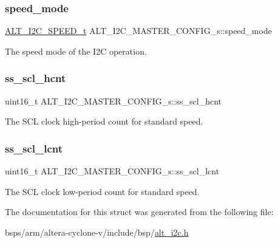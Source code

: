 \subsubsection{\texorpdfstring{speed\_mode}{speed\_mode}}
{\footnotesize\ttfamily \mbox{\hyperlink{group__ALT__I2C_ga1601b0e27fb2a82170d10b4f6bdedbf6}{A\+L\+T\+\_\+\+I2\+C\+\_\+\+S\+P\+E\+E\+D\+\_\+t}} A\+L\+T\+\_\+\+I2\+C\+\_\+\+M\+A\+S\+T\+E\+R\+\_\+\+C\+O\+N\+F\+I\+G\+\_\+s\+::speed\+\_\+mode}

The speed mode of the I2C operation. \mbox{\label{structALT__I2C__MASTER__CONFIG__s_a2c2147d744d76fa6df10232eecb097fa}} 
\subsubsection{\texorpdfstring{ss\_scl\_hcnt}{ss\_scl\_hcnt}}
{\footnotesize\ttfamily uint16\+\_\+t A\+L\+T\+\_\+\+I2\+C\+\_\+\+M\+A\+S\+T\+E\+R\+\_\+\+C\+O\+N\+F\+I\+G\+\_\+s\+::ss\+\_\+scl\+\_\+hcnt}

The S\+CL clock high-\/period count for standard speed. \mbox{\label{structALT__I2C__MASTER__CONFIG__s_a42a8443ec6e4f7524c0cc6b5c58d676e}} 
\subsubsection{\texorpdfstring{ss\_scl\_lcnt}{ss\_scl\_lcnt}}
{\footnotesize\ttfamily uint16\+\_\+t A\+L\+T\+\_\+\+I2\+C\+\_\+\+M\+A\+S\+T\+E\+R\+\_\+\+C\+O\+N\+F\+I\+G\+\_\+s\+::ss\+\_\+scl\+\_\+lcnt}

The S\+CL clock low-\/period count for standard speed. 

The documentation for this struct was generated from the following file\+:\begin{DoxyCompactItemize}
\item 
bsps/arm/altera-\/cyclone-\/v/include/bsp/\mbox{\hyperlink{alt__i2c_8h}{alt\+\_\+i2c.\+h}}\end{DoxyCompactItemize}
